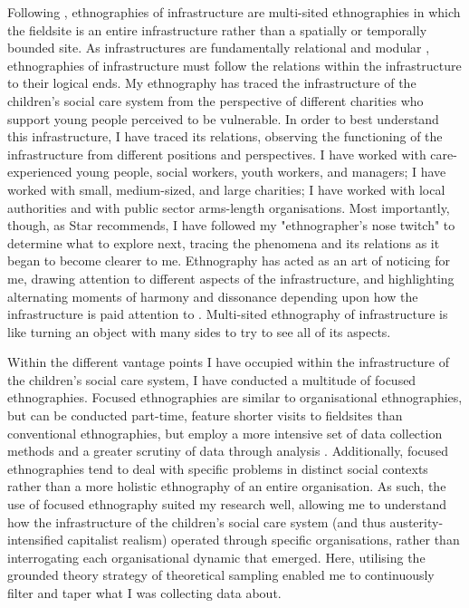 Following \citet{star_ethnography_1999}, ethnographies of infrastructure are multi-sited ethnographies in which the fieldsite is an entire infrastructure rather than a spatially or temporally bounded site. As infrastructures are fundamentally relational and modular \citep{star_steps_1996}, ethnographies of infrastructure must follow the relations within the infrastructure to their logical ends. My ethnography has traced the infrastructure of the children’s social care system from the perspective of different charities who support young people perceived to be vulnerable. In order to best understand this infrastructure, I have traced its relations, observing the functioning of the infrastructure from different positions and perspectives. I have worked with care-experienced young people, social workers, youth workers, and managers; I have worked with small, medium-sized, and large charities; I have worked with local authorities and with public sector arms-length organisations. Most importantly, though, as Star recommends, I have followed my "ethnographer’s nose twitch" \citep[p. 610]{leigh_star_this_2010} to determine what to explore next, tracing the phenomena and its relations as it began to become clearer to me. Ethnography has acted as an art of noticing for me, drawing attention to different aspects of the infrastructure, and highlighting alternating moments of harmony and dissonance depending upon how the infrastructure is paid attention to \citep[p. 24]{tsing_mushroom_2017}. Multi-sited ethnography of infrastructure is like turning an object with many sides to try to see all of its aspects.  

Within the different vantage points I have occupied within the infrastructure of the children's social care system, I have conducted a multitude of focused ethnographies. Focused ethnographies are similar to organisational ethnographies, but can be conducted part-time, feature shorter visits to fieldsites than conventional ethnographies, but employ a more intensive set of data collection methods and a greater scrutiny of data through analysis \citep{knoblauch_focused_2005}. Additionally, focused ethnographies tend to deal with specific problems in distinct social contexts \citep{wall_focused_2014} rather than a more holistic ethnography of an entire organisation. As such, the use of focused ethnography suited my research well, allowing me to understand how the infrastructure of the children's social care system (and thus austerity-intensified capitalist realism) operated through specific organisations, rather than interrogating each organisational dynamic that emerged. Here, utilising the grounded theory strategy of theoretical sampling \citep[p. 96]{charmaz_constructing_2006} enabled me to continuously filter and taper what I was collecting data about. 

